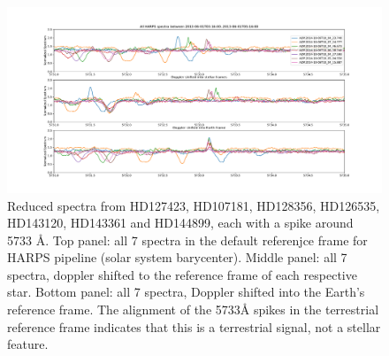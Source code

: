 \documentclass[linenumbers]{aastex631}
\begin{document}
\begin{figure}
    \centering
    \includegraphics[width=\textwidth]{HD127423Dopplershift.pdf}
    \caption{Reduced spectra from HD127423, HD107181, HD128356, HD126535, HD143120, HD143361 and HD144899, each with a spike around 5733 \AA. Top panel: all 7 spectra in the default referenjce frame for HARPS pipeline (solar system barycenter). Middle panel: all 7 spectra, doppler shifted to the reference frame of each respective star. Bottom panel: all 7 spectra, Doppler shifted into the Earth's reference frame.  The alignment of the 5733{\AA} spikes in the terrestrial reference frame indicates that this is a terrestrial signal, not a stellar feature.}
    \label{fig:stellarframespectra}
\end{figure}
\end{document}
